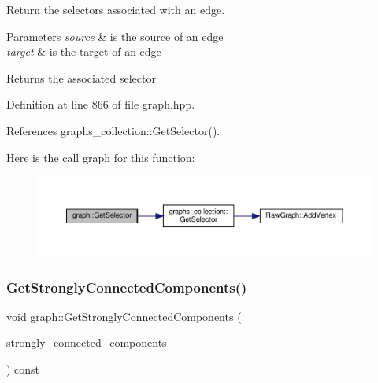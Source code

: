 Return the selectors associated with an edge. 


\begin{DoxyParams}{Parameters}
{\em source} & is the source of an edge \\
\hline
{\em target} & is the target of an edge \\
\hline
\end{DoxyParams}
\begin{DoxyReturn}{Returns}
the associated selector 
\end{DoxyReturn}


Definition at line 866 of file graph.\+hpp.



References graphs\+\_\+collection\+::\+Get\+Selector().

Here is the call graph for this function\+:
\nopagebreak
\begin{figure}[H]
\begin{center}
\leavevmode
\includegraphics[width=350pt]{d5/d15/structgraph_a5e83fae90882209faaf9d5cf78a40a53_cgraph}
\end{center}
\end{figure}
\mbox{\label{structgraph_a5cf44c94e071e11db6859022de2407ed}} 
\subsubsection{\texorpdfstring{Get\+Strongly\+Connected\+Components()}{GetStronglyConnectedComponents()}}
{\footnotesize\ttfamily void graph\+::\+Get\+Strongly\+Connected\+Components (\begin{DoxyParamCaption}\item[{std\+::map$<$ \hyperlink{tutorial__fpt__2017_2intro_2sixth_2test_8c_a7c94ea6f8948649f8d181ae55911eeaf}{size\+\_\+t}, \hyperlink{custom__set_8hpp_a1f63d303cef2790dc0a0ff7feae38f83}{Unordered\+Set\+Std\+Stable}$<$ boost\+::graph\+\_\+traits$<$ \hyperlink{structgraphs__collection}{graphs\+\_\+collection} $>$\+::vertex\+\_\+descriptor $>$$>$ \&}]{strongly\+\_\+connected\+\_\+components }\end{DoxyParamCaption}) const\hspace{0.3cm}{\ttfamily [inline]}}



